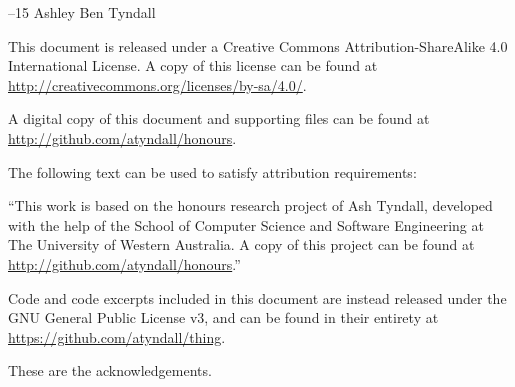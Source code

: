 \documentclass{../cshonours}
\title{\thetitle}
\author{\theauthor}
\begin{document}
\newcommand{\mainfile}{} %

\maketitle

\begin{abstract}
This is the abstract.
\end{abstract}

\newpage
\null
\vfill 
\noindent{\fontsize{40pt}{1em}\selectfont \ccbysa}

\null

\noindent\textcopyright\xspace 2014--15 Ashley Ben Tyndall

\noindent This document is released under a Creative Commons Attribution-ShareAlike 4.0 International License. A copy of this license can be found at \\ \url{http://creativecommons.org/licenses/by-sa/4.0/}.

\noindent A digital copy of this document and supporting files can be found at \\ \url{http://github.com/atyndall/honours}. %

\noindent The following text can be used to satisfy attribution requirements:

\noindent ``This work is based on the honours research project of Ash Tyndall,  developed with the help of the School of Computer Science and Software Engineering at The University of Western Australia. A copy of this project can be found at \\ \url{http://github.com/atyndall/honours}.''
	
\noindent Code and code excerpts included in this document are instead released under the GNU General Public License v3, and can be found in their entirety at \\ \url{https://github.com/atyndall/thing}.

\newpage

\begin{acknowledgements}
These are the acknowledgements.

\end{acknowledgements}

\tableofcontents
\listoftables
\listoffigures









\appendix




\end{document}
